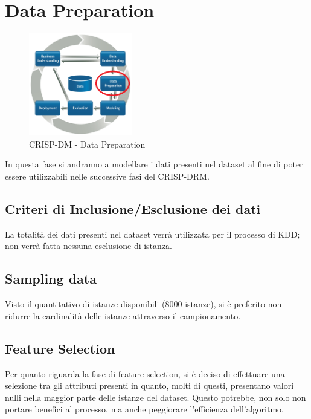 \chapter{Data Preparation}

\begin{figure}[hbtp]
	\centering
	\includegraphics[width=0.4\textwidth]{./images/CRISPDM_3.png}
	\caption{CRISP-DM - Data Preparation}
	\label{CRISPDM_3}
\end{figure}
In questa fase si andranno a modellare i dati presenti nel dataset al fine di poter essere utilizzabili nelle successive fasi del CRISP-DRM.
\section{Criteri di Inclusione/Esclusione dei dati}
La totalità dei dati presenti nel dataset verrà utilizzata per il processo di KDD; non verrà fatta nessuna esclusione di istanza.
\section{Sampling data}
Visto il quantitativo di istanze disponibili (8000 istanze), si è preferito non ridurre la cardinalità delle istanze attraverso il campionamento.
\section{Feature Selection}
\label{Feature Selection}
Per quanto riguarda la fase di feature selection, si è deciso di effettuare una selezione tra gli attributi presenti in quanto, molti di questi, presentano valori nulli nella maggior parte delle istanze del dataset. Questo potrebbe, non solo non portare benefici al processo, ma anche peggiorare l'efficienza dell'algoritmo.


